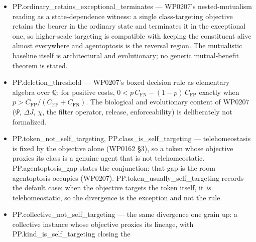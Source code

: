 \documentclass[11pt,a4paper]{article}
\newcommand{\lean}[1]{{\ttfamily\small
  \let\leanunderscore\_\def\_{\leanunderscore\allowbreak}#1}}
\begin{document}
\begin{itemize}[leftmargin=1.4em,itemsep=1pt]
\lean{PP.CollectiveSelfTargeting} with its projection lemmas
\lean{PP.collective\_self\_targeting\_requires\_agent} and
\lean{PP.collective\_self\_targeting\_requires\_target}, and
\lean{PP.terminal\_action\_underdetermines\_target} --- the WP0207 v0.8 ontology in
\lean{Agentoptosis.lean}: an agentoptotic event requires constituent agenthood and internal
selection of the terminal action, and deliberately carries no target or beneficiary field; an
other-directed objective is not telehomeostatic for its bearer; naming a pattern as target promotes
nothing; higher-scale telehomeostasis is by definition collective agenthood plus a self-targeting
collective objective; and the same terminal action arises under objectives with distinct targets,
so self-termination alone cannot identify the persistence target.
\item \lean{PP.ordinary\_retains\_exceptional\_terminates} --- WP0207's nested-mutualism reading
as a state-dependence witness: a single class-targeting objective retains the bearer in the
ordinary state and terminates it in the exceptional one, so higher-scale targeting is compatible
with keeping the constituent alive almost everywhere and agentoptosis is the reversal region. The
mutualistic baseline itself is architectural and evolutionary; no generic mutual-benefit theorem is
stated.
\item \lean{PP.deletion\_threshold} --- WP0207's boxed decision rule as elementary algebra over
$\mathbb Q$: for positive costs, $0 < p\,C_{\mathrm{FN}} - (1-p)\,C_{\mathrm{FP}}$ exactly when
$p > C_{\mathrm{FP}}/(C_{\mathrm{FP}}+C_{\mathrm{FN}})$. The biological and evolutionary content of
WP0207 ($\Psi$, $\Delta J$, $\chi$, the filter operator, release, enforceability) is deliberately
not formalized.
\item \lean{PP.token\_not\_self\_targeting}, \lean{PP.class\_is\_self\_targeting} --- telehomeostasis
is fixed by the objective alone (WP0162 \S3), so a token whose objective proxies its class is a
genuine agent that is not telehomeostatic. \lean{PP.agentoptosis\_gap} states the conjunction: that
gap is the room agentoptosis occupies (WP0207). \lean{PP.token\_usually\_self\_targeting} records the
default case: when the objective targets the token itself, it \emph{is} telehomeostatic, so the
divergence is the exception and not the rule.
\item \lean{PP.collective\_not\_self\_targeting} --- the same divergence one grain up: a collective
instance whose objective proxies its lineage, with \lean{PP.kind\_is\_self\_targeting} closing the

\end{itemize}
\end{document}
